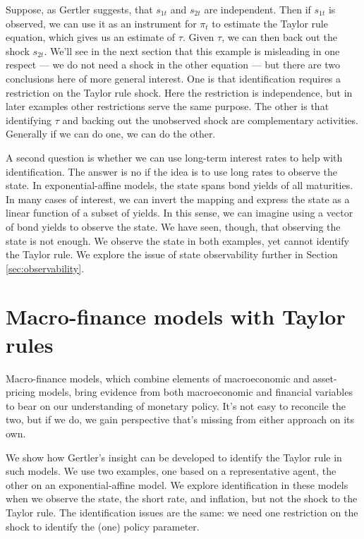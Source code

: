 \documentclass[12pt]{article}
\begin{document}
{Suppose, as Gertler suggests, that $s_{1t}$ and $s_{2t}$ are independent.
Then if $s_{1t}$ is observed,
we can use it as an instrument for $\pi_t$ to estimate the Taylor rule
equation, which gives us an estimate of $\tau$.
Given $\tau$, we can then back out the shock $s_{2t}$.
We'll see in the next section that this example is misleading
in one respect ---  we do not need a shock in the other equation ---
but there are two conclusions here of more general interest.
One is that identification requires a restriction on the Taylor rule shock.
Here the restriction is independence, but in later examples
other restrictions serve the same purpose.
The other is that identifying $\tau$
and backing out the unobserved shock are complementary activities.
Generally if we can do one, we can do the other.

A second question is whether we can use long-term interest rates to
help with identification.
The answer is no if the idea is to use long rates to observe the state.
In exponential-affine models, the state spans bond yields of all maturities.
In many cases of interest, we can invert the mapping and express
the state as a linear function of a subset of yields.
In this sense, we can imagine using a vector of bond yields
to observe the state.
%
We have seen, though, that observing the state is not enough.
We observe the state in both examples,
yet cannot identify the Taylor rule.
We explore the issue of state observability further in Section \ref{sec:observability}.


\section{Macro-finance models with Taylor rules}
\label{sec:macrofin}

Macro-finance models, which combine elements of
macroeconomic and asset-pricing models,
bring evidence from both macroeconomic and financial variables to bear
on our understanding of monetary policy.
It's not easy to reconcile the two,
but if we do, we gain perspective that's
missing from either approach on its own.

We show how Gertler's insight can be developed to identify
the Taylor rule in such models.
We use two examples, one based on a representative agent,
the other on an exponential-affine model.
We explore identification in these models when we observe the state,
the short rate, and inflation,
but not the shock to the Taylor rule.
The identification issues are the same:  we need one restriction on the shock
to identify the (one) policy parameter.


}
\end{document}
